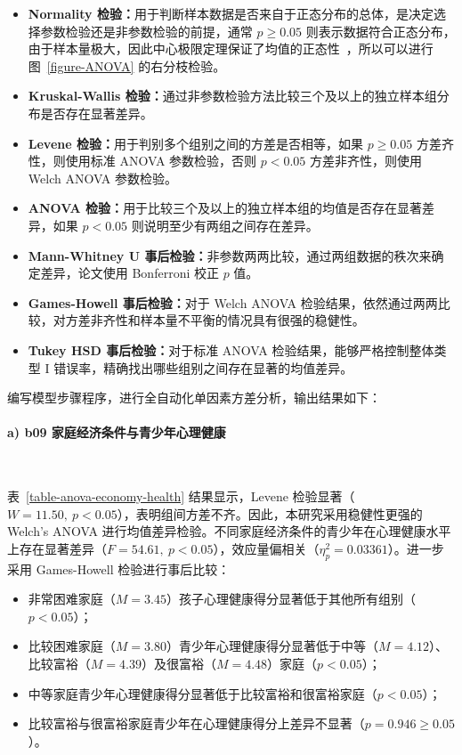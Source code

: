 \documentclass[zihao = -4, linespread = 1.5]{article}
\begin{document}
\begin{itemize}
    \item \textbf{Normality 检验：}用于判断样本数据是否来自于正态分布的总体，是决定选择参数检验还是非参数检验的前提，通常 $p\geqslant0.05$ 则表示数据符合正态分布，由于样本量极大，因此中心极限定理保证了均值的正态性~\citep{Moivre,Polya}，所以可以进行图~\ref{figure-ANOVA} 的右分枝检验。
    \item \textbf{Kruskal-Wallis 检验：}通过非参数检验方法比较三个及以上的独立样本组分布是否存在显著差异。
    \item \textbf{Levene 检验：}用于判别多个组别之间的方差是否相等，如果 $p\geqslant0.05$ 方差齐性，则使用标准 ANOVA 参数检验，否则 $p<0.05$ 方差非齐性，则使用 Welch ANOVA 参数检验。
    \item \textbf{ANOVA 检验：}用于比较三个及以上的独立样本组的均值是否存在显著差异，如果 $p<0.05$ 则说明至少有两组之间存在差异。
    \item \textbf{Mann-Whitney U 事后检验：}非参数两两比较，通过两组数据的秩次来确定差异，论文使用 Bonferroni 校正 $p$ 值。
    \item \textbf{Games-Howell 事后检验：}对于 Welch ANOVA 检验结果，依然通过两两比较，对方差非齐性和样本量不平衡的情况具有很强的稳健性。
    \item \textbf{Tukey HSD 事后检验：}对于标准 ANOVA 检验结果，能够严格控制整体类型 $\mathrm{I}$ 错误率，精确找出哪些组别之间存在显著的均值差异。
\end{itemize}

编写模型步骤程序，进行全自动化单因素方差分析，输出结果如下：

\paragraph*{a) b09 家庭经济条件与青少年心理健康}~{}

表~\ref{table-anova-economy-health} 结果显示，Levene 检验显著（$W=11.50,\ p<0.05$），表明组间方差不齐。因此，本研究采用稳健性更强的 Welch's ANOVA 进行均值差异检验。不同家庭经济条件的青少年在心理健康水平上存在显著差异（$F=54.61,\ p<0.05$），效应量偏相关（$\eta^2_p = 0.03361$）。进一步采用 Games-Howell 检验进行事后比较：

\begin{itemize}
    \item 非常困难家庭（$M=3.45$）孩子心理健康得分显著低于其他所有组别（$p<0.05$）；
    \item 比较困难家庭（$M=3.80$）青少年心理健康得分显著低于中等（$M=4.12$）、比较富裕（$M=4.39$）及很富裕（$M=4.48$）家庭（$p<0.05$）；
    \item 中等家庭青少年心理健康得分显著低于比较富裕和很富裕家庭（$p<0.05$）；
    \item 比较富裕与很富裕家庭青少年在心理健康得分上差异不显著（$p=0.946\geqslant0.05$）。
\end{itemize}
\end{document}
